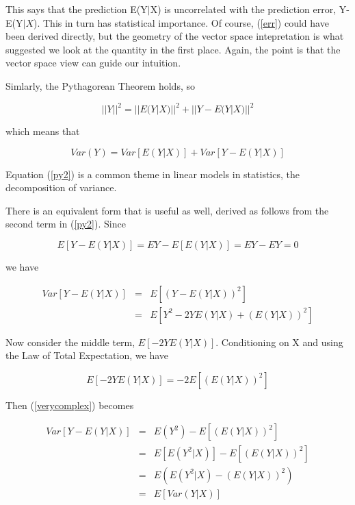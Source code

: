 \documentclass[11pt]{article}
\begin{document}
This says that the prediction E(Y$|$X) is uncorrelated with the
prediction error, Y-E(Y$|X$).  This in turn has statistical importance.
Of course, (\ref{err}) could have been derived directly, but the
geometry of the vector space intepretation is what suggested we look at
the quantity in the first place.  Again, the point is that the vector
space view can guide our intuition.

Simlarly, the Pythagorean Theorem holds, so

\begin{equation}
\label{py}
{||Y||}^2 = {||E(Y|X)||}^2 + {||Y-E(Y|X)||}^2
\end{equation}

which means that

\begin{equation}
\label{py2}
Var(Y) = Var[E(Y|X)] + Var[Y-E(Y|X)]
\end{equation}

Equation (\ref{py2}) is a common theme in linear models in statistics,
the decomposition of variance.  

There is an equivalent form that is useful as well, derived as follows
from the second term in (\ref{py2}).  Since

\begin{equation}
E[Y-E(Y|X)] = EY - E[E(Y|X)] = EY - EY = 0
\end{equation}

we have

\begin{eqnarray}
\label{verycomplex}
Var[Y-E(Y|X)] &=& E \left [ (Y-E(Y|X))^2 \right ] \\ 
&=& E \left [ Y^2 -2YE(Y|X) + (E(Y|X))^2 \right ] 
\end{eqnarray}

Now consider the middle term, $E[-2YE(Y|X)]$.  Conditioning on X and
using the Law of Total Expectation, we have

\begin{equation}
E[-2YE(Y|X)] = -2 E \left [ (E(Y|X))^2 \right ]
\end{equation}

Then (\ref{verycomplex}) becomes

\begin{eqnarray}
Var[Y-E(Y|X)] &=& E (Y^2) - E \left [ (E(Y|X))^2 \right ] \\
&=& E \left [ E(Y^2 | X) \right ] - E \left [ (E(Y|X))^2 \right ] \\
&=& E \left ( E(Y^2 | X) - (E(Y|X))^2 \right ) \\
&=& E \left [ Var(Y|X) \right ]
\end{eqnarray}
\end{document}
